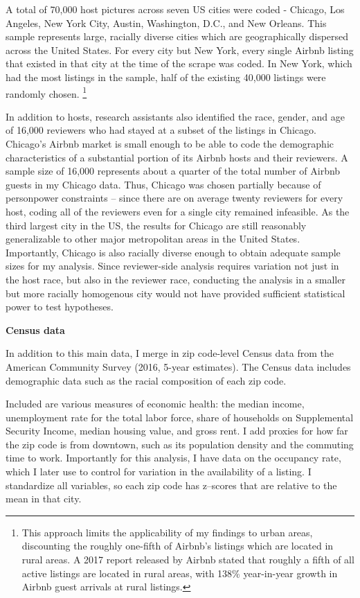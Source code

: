 A total of 70,000 host pictures across seven US cities were coded - Chicago, Los Angeles, New York City, Austin, Washington, D.C., and New Orleans. This sample represents large, racially diverse cities which are geographically dispersed across the United States. For every city but New York, every single Airbnb listing that existed in that city at the time of the scrape was coded. In New York, which had the most listings in the sample, half of the existing 40,000 listings were randomly chosen.%
	\footnote{This approach limits the applicability of my findings to urban areas, discounting the roughly one-fifth of Airbnb's listings which are located in rural areas. A 2017 report released by Airbnb stated that roughly a fifth of all active listings are located in rural areas, with 138\% year-in-year growth in Airbnb guest arrivals at rural listings.} 

In addition to hosts, research assistants also identified the race, gender, and age of 16,000 reviewers who had stayed at a subset of the listings in Chicago. Chicago's Airbnb market is small enough to be able to code the demographic characteristics of a substantial portion of its Airbnb hosts and their reviewers. A sample size of 16,000 represents about a quarter of the total number of Airbnb guests in my Chicago data. Thus, Chicago was chosen partially because of personpower constraints -- since there are on average twenty reviewers for every host, coding all of the reviewers even for a single city remained infeasible. As the third largest city in the US, the results for Chicago are still reasonably generalizable to other major metropolitan areas in the United States. Importantly, Chicago is also racially diverse enough to obtain adequate sample sizes for my analysis. Since reviewer-side analysis requires variation not just in the host race, but also in the reviewer race, conducting the analysis in a smaller but more racially homogenous city would not have provided sufficient statistical power to test hypotheses.  


\textbf{Census data} 

In addition to this main data, I merge in zip code-level Census data from the American Community Survey (2016, 5-year estimates). The Census data includes demographic data such as the racial composition of each zip code. 

Included are various measures of economic health: the median income, unemployment rate for the total labor force, share of households on Supplemental Security Income, median housing value, and gross rent. I add proxies for how far the zip code is from downtown, such as its population density and the commuting time to work. Importantly for this analysis, I have data on the occupancy rate, which I later use to control for variation in the availability of a listing. I standardize all variables, so each zip code has z--scores that are relative to the mean in that city. 

